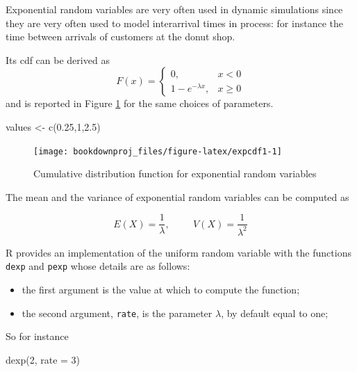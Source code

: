 \documentclass[
]{book}
\newenvironment{Shaded}{\begin{snugshade}}{\end{snugshade}}
\newcommand{\AttributeTok}[1]{\textcolor[rgb]{0.77,0.63,0.00}{#1}}
\newcommand{\DecValTok}[1]{\textcolor[rgb]{0.00,0.00,0.81}{#1}}
\newcommand{\FloatTok}[1]{\textcolor[rgb]{0.00,0.00,0.81}{#1}}
\newcommand{\FunctionTok}[1]{\textcolor[rgb]{0.00,0.00,0.00}{#1}}
\newcommand{\NormalTok}[1]{#1}
\newcommand{\OtherTok}[1]{\textcolor[rgb]{0.56,0.35,0.01}{#1}}
\begin{document}
Exponential random variables are very often used in dynamic simulations since they are very often used to model interarrival times in process: for instance the time between arrivals of customers at the donut shop.

Its cdf can be derived as
\[
F(x)=\left\{
\begin{array}{ll}
0, & x <0\\
1-e^{-\lambda x}, & x\geq 0
\end{array}
\right.
\]
and is reported in Figure \ref{fig:expcdf1} for the same choices of parameters.

\begin{Shaded}
\begin{Highlighting}[]
\NormalTok{values }\OtherTok{\textless{}{-}} \FunctionTok{c}\NormalTok{(}\FloatTok{0.25}\NormalTok{,}\DecValTok{1}\NormalTok{,}\FloatTok{2.5}\NormalTok{)}
\end{Highlighting}
\end{Shaded}

\begin{figure}

{\centering \texttt{[image: bookdownproj\_files/figure-latex/expcdf1-1]} 

}

\caption{Cumulative distribution function for exponential random variables}\label{fig:expcdf1}
\end{figure}

The mean and the variance of exponential random variables can be computed as

\[
E(X)=\frac{1}{\lambda}, \hspace{1cm} V(X)=\frac{1}{\lambda^2}
\]

R provides an implementation of the uniform random variable with the functions \texttt{dexp} and \texttt{pexp} whose details are as follows:

\begin{itemize}
\item
  the first argument is the value at which to compute the function;
\item
  the second argument, \texttt{rate}, is the parameter \(\lambda\), by default equal to one;
\end{itemize}

So for instance

\begin{Shaded}
\begin{Highlighting}[]
\FunctionTok{dexp}\NormalTok{(}\DecValTok{2}\NormalTok{, }\AttributeTok{rate =} \DecValTok{3}\NormalTok{)}
\end{Highlighting}
\end{Shaded}
\end{document}

